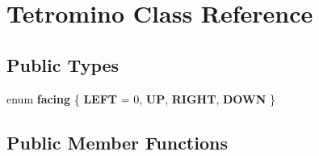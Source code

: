 \hypertarget{class_tetromino}{\section{Tetromino Class Reference}
\label{class_tetromino}
}
\subsection*{Public Types}
\begin{DoxyCompactItemize}
\item 
enum {\bfseries facing} \{ {\bfseries L\-E\-F\-T} = 0, 
{\bfseries U\-P}, 
{\bfseries R\-I\-G\-H\-T}, 
{\bfseries D\-O\-W\-N}
 \}
\end{DoxyCompactItemize}
\subsection*{Public Member Functions}
